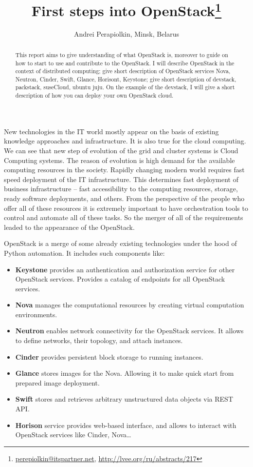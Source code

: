 \documentclass[10pt, a5paper]{article}
\begin{document}
\title{First steps into OpenStack\footnote{\url{perepiolkin@itspartner.net}, \url{http://lvee.org/ru/abstracts/217}}}
\author{Andrei Perapiolkin, Minsk, Belarus}
\maketitle
\begin{abstract}
This report aims to give understanding of what OpenStack is, moreover to guide on how to start to use and contribute to the OpenStack. I will describe OpenStack in the context of distributed computing; give short description of OpenStack services Nova, Neutron, Cinder, Swift, Glance, Horisont, Keystone; give short description of devstack, packstack, suseCloud, ubuntu juju. On the example of the devstack, I will give a short description of how you can deploy your own OpenStack cloud.
\end{abstract}


New technologies in the IT world mostly appear on the basis of existing knowledge approaches and infrastructure. It is also true for the cloud computing. We can see that new step of evolution of the grid and cluster systems is Cloud Computing systems. The reason of evolution is high demand for the available computing resources in the society. Rapidly changing modern world requires fast speed deployment of the IT infrastructure. This determines fast deployment of business infrastructure -- fast accessibility to the computing resources, storage, ready software deployments, and others. From the perspective of the people who offer all of these resources it is extremely important to have orchestration tools to control and automate all of these tasks. So the merger of all of the requirements leaded to the appearance of the OpenStack.

OpenStack is a merge of some already existing technologies under the hood of Python automation. It includes such components like:

\begin{itemize}
  \item \textbf{Keystone} provides an authentication and authorization service for other OpenStack services. Provides a catalog of endpoints for all OpenStack services.
  \item \textbf{Nova} manages the computational resources by creating virtual computation environments.
  \item \textbf{Neutron} enables network connectivity for the OpenStack services. It allows to define networks, their topology, and attach instances.
  \item \textbf{Cinder} provides persistent block storage to running instances.
  \item \textbf{Glance} stores images for the Nova. Allowing it to make quick start from prepared image deployment.
  \item \textbf{Swift} stores and retrieves arbitrary unstructured data objects via REST API.
  \item \textbf{Horison} service provides web-based interface, and allows to \linebreak interact with OpenStack services like Cinder, Nova…
\end{itemize}
\end{document}
